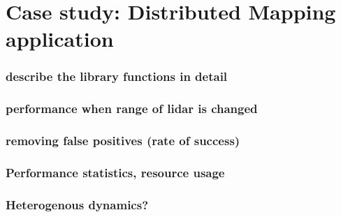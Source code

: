 \section{Case study: Distributed Mapping application}
\label{sec:experims}
\subsubsection{describe the library functions in detail}
\subsubsection{performance when range of lidar is changed}
\subsubsection{removing false positives (rate of success)}
\subsubsection{Performance statistics, resource usage}
\subsubsection{Heterogenous dynamics?}